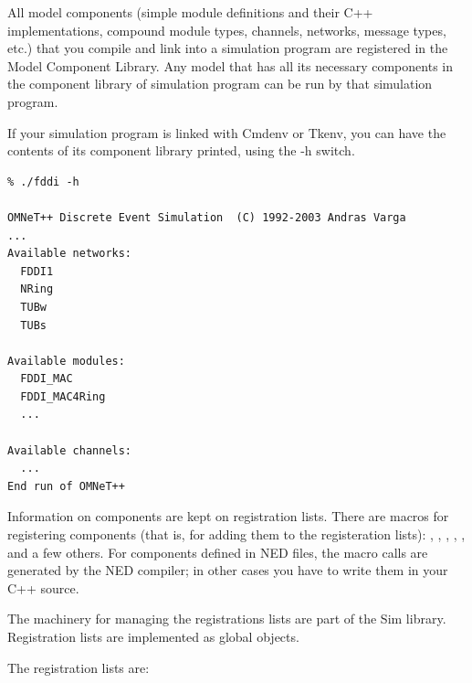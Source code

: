 All model components (simple module definitions and their C++
implementations, compound module types, channels, networks,
message types, etc.) that you compile and link into a simulation
program are registered in the Model Component Library.
Any model that has all its necessary components in the
component library of simulation program can be run by that
simulation program.

If your simulation program is linked with Cmdenv or Tkenv,
you can have the contents of its component library printed,
using the -h switch.

\begin{verbatim}
% ./fddi -h

OMNeT++ Discrete Event Simulation  (C) 1992-2003 Andras Varga
...
Available networks:
  FDDI1
  NRing
  TUBw
  TUBs

Available modules:
  FDDI_MAC
  FDDI_MAC4Ring
  ...

Available channels:
  ...
End run of OMNeT++
\end{verbatim}

Information on components are kept on registration lists.
There are macros for registering components (that is, for adding
them to the registeration lists):
, ,
, ,
, and a few others. For components defined
in NED files, the macro calls are generated by the NED compiler;
in other cases you have to write them in your C++ source.

The machinery for managing the registrations lists are part
of the Sim library. Registration lists are implemented
as global objects.

The registration lists are:

